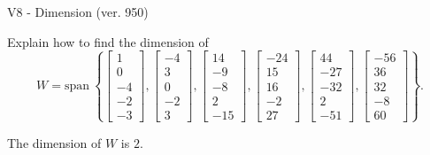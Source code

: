 \begin{exercise}
  \begin{exerciseTitle}V8 - Dimension (ver. 950)\end{exerciseTitle}
  \begin{exerciseStatement}
    Explain how to find the dimension of 
\[W=\mathrm{span}\ \left\{\left[\begin{array}{r}
1 \\
0 \\
-4 \\
-2 \\
-3
\end{array}\right] , \left[\begin{array}{r}
-4 \\
3 \\
0 \\
-2 \\
3
\end{array}\right] , \left[\begin{array}{r}
14 \\
-9 \\
-8 \\
2 \\
-15
\end{array}\right] , \left[\begin{array}{r}
-24 \\
15 \\
16 \\
-2 \\
27
\end{array}\right] , \left[\begin{array}{r}
44 \\
-27 \\
-32 \\
2 \\
-51
\end{array}\right] , \left[\begin{array}{r}
-56 \\
36 \\
32 \\
-8 \\
60
\end{array}\right]\right\}.\]



  \end{exerciseStatement}
  \begin{exerciseAnswer}
   The dimension of \(W\) is  \(2\).
  


  \end{exerciseAnswer}
\end{exercise}